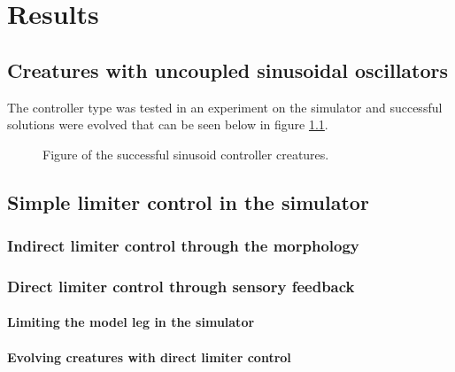 \documentclass[main]{subfiles}
\begin{document}
\setcounter{chapter}{3}

\chapter{Results} %

\label{Chapter\thechapter} %


\section{Creatures with uncoupled sinusoidal oscillators}

The controller type was tested in an experiment on the simulator and successful solutions were evolved that can be seen below in figure \ref{figure:successfulcreatures}.

\begin{figure}[!h]
\centering
{}
\caption[Figure of the successful sinusoid controller creatures.]{Figure of the successful sinusoid controller creatures.}
\label{figure:successfulcreatures}
\end{figure}

\section{Simple limiter control in the simulator}


\subsection{Indirect limiter control through the morphology}


\subsection{Direct limiter control through sensory feedback}


\subsubsection{Limiting the model leg in the simulator}


\subsubsection{Evolving creatures with direct limiter control}


\end{document}
